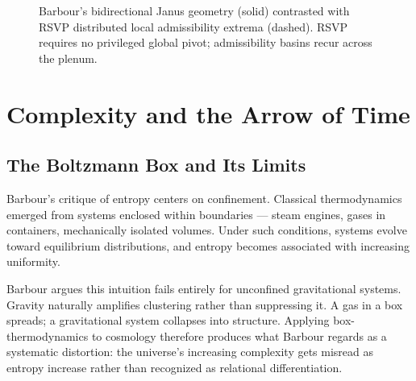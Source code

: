 \documentclass[12pt, a4paper]{article}
\begin{document}
\begin{figure}[H]
\centering
{}
\caption{Barbour's bidirectional Janus geometry (solid) contrasted with
RSVP distributed local admissibility extrema (dashed). RSVP requires no
privileged global pivot; admissibility basins recur across the plenum.}
\end{figure}

\section{Complexity and the Arrow of Time}

\subsection{The Boltzmann Box and Its Limits}

Barbour's critique of entropy centers on confinement. Classical
thermodynamics emerged from systems enclosed within boundaries — steam
engines, gases in containers, mechanically isolated volumes. Under such
conditions, systems evolve toward equilibrium distributions, and entropy
becomes associated with increasing uniformity.

Barbour argues this intuition fails entirely for unconfined gravitational
systems. Gravity naturally amplifies clustering rather than suppressing it.
A gas in a box spreads; a gravitational system collapses into structure.
Applying box-thermodynamics to cosmology therefore produces what Barbour
regards as a systematic distortion: the universe's increasing complexity gets
misread as entropy increase rather than recognized as relational
differentiation.
\end{document}
